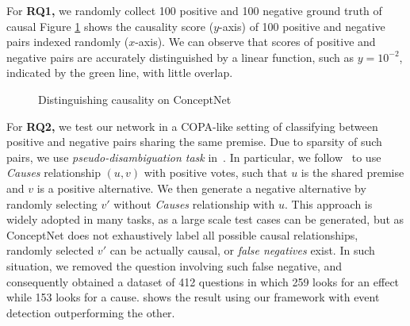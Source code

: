 


For {\bf RQ1,}
we randomly  collect 100 positive and 100 negative ground truth of
causal Figure \ref{fig:conceptApp1} shows the causality score
($y$-axis) of 100 positive and negative pairs indexed randomly
($x$-axis). We can observe that scores of positive and negative
pairs are accurately distinguished by a linear function, such as
$y=10^{-2}$, indicated by the green line, with little overlap.

\begin{figure}[th]
\centering
{}
\caption{Distinguishing causality on ConceptNet}
\label{fig:conceptApp1}
\end{figure}

For {\bf RQ2,} we test our network in a COPA-like setting
of classifying between positive and negative pairs sharing the same premise.
Due to sparsity of such pairs,
we use \emph{pseudo-disambiguation task} in~\cite{Erk}.
In particular, we follow~\cite{Erk} to use
\emph{Causes} relationship
$(u,v)$ with positive votes, such that $u$ is the shared
premise and $v$ is a positive alternative.
We then generate a negative alternative by randomly selecting
$v'$ without \emph{Causes} relationship with $u$.
This approach is widely adopted in many tasks,
as a large scale test cases can be generated,
but as ConceptNet does not exhaustively label all possible causal relationships,
randomly selected $v'$ can be actually causal, or \emph{false negatives} exist.
In such situation, we removed the question involving such false negative,
and consequently obtained a dataset of 412 questions in which
259 looks for an effect while 153 looks for a cause. 
shows the result using our framework with event detection outperforming
the other.

